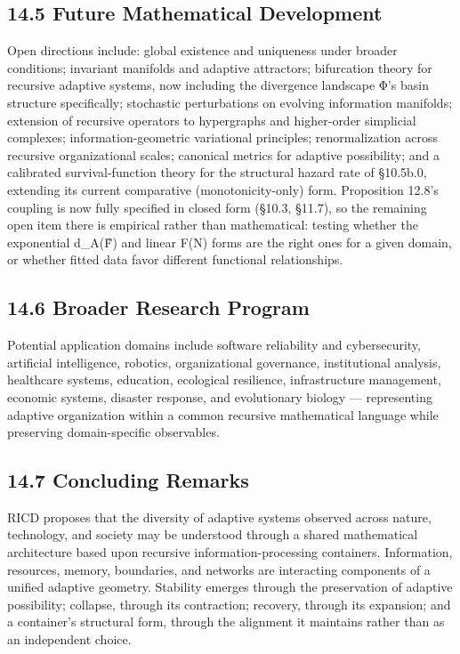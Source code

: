 \documentclass[
]{article}
\begin{document}
\hypertarget{future-mathematical-development}{%
\subsection{14.5 Future Mathematical
Development}\label{future-mathematical-development}}

Open directions include: global existence and uniqueness under broader
conditions; invariant manifolds and adaptive attractors; bifurcation
theory for recursive adaptive systems, now including the divergence
landscape Φ's basin structure specifically; stochastic perturbations on
evolving information manifolds; extension of recursive operators to
hypergraphs and higher-order simplicial complexes; information-geometric
variational principles; renormalization across recursive organizational
scales; canonical metrics for adaptive possibility; and a calibrated
survival-function theory for the structural hazard rate of §10.5b.0,
extending its current comparative (monotonicity-only) form. Proposition
12.8's coupling is now fully specified in closed form (§10.3, §11.7), so
the remaining open item there is empirical rather than mathematical:
testing whether the exponential d\_A(F̃) and linear F(N) forms are the
right ones for a given domain, or whether fitted data favor different
functional relationships.

\hypertarget{broader-research-program}{%
\subsection{14.6 Broader Research
Program}\label{broader-research-program}}

Potential application domains include software reliability and
cybersecurity, artificial intelligence, robotics, organizational
governance, institutional analysis, healthcare systems, education,
ecological resilience, infrastructure management, economic systems,
disaster response, and evolutionary biology --- representing adaptive
organization within a common recursive mathematical language while
preserving domain-specific observables.

\hypertarget{concluding-remarks}{%
\subsection{14.7 Concluding Remarks}\label{concluding-remarks}}

RICD proposes that the diversity of adaptive systems observed across
nature, technology, and society may be understood through a shared
mathematical architecture based upon recursive information-processing
containers. Information, resources, memory, boundaries, and networks are
interacting components of a unified adaptive geometry. Stability emerges
through the preservation of adaptive possibility; collapse, through its
contraction; recovery, through its expansion; and a container's
structural form, through the alignment it maintains rather than as an
independent choice.
\end{document}
